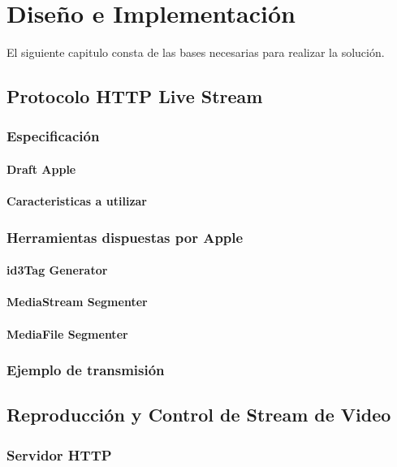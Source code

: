\chapter{Diseño e Implementación}
El siguiente capitulo consta de las bases necesarias para realizar la solución.
\section{Protocolo HTTP Live Stream}
	\subsection{Especificación}
		\subsubsection{Draft Apple}
		\subsubsection{Caracteristicas a utilizar}
			
	\subsection{Herramientas dispuestas por Apple}
		\subsubsection{id3Tag Generator}
		\subsubsection{MediaStream Segmenter}
		\subsubsection{MediaFile Segmenter}
	\subsection{Ejemplo de transmisión}
\clearpage	
\section{Reproducción y Control de Stream de Video}
	\subsection{Servidor HTTP}
